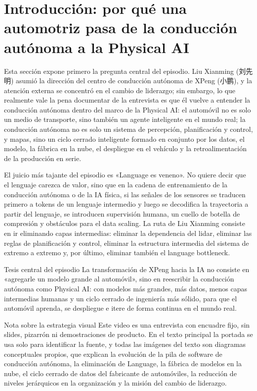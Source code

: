 \section{Introducción: por qué una automotriz pasa de la conducción autónoma a la Physical AI}

Esta sección expone primero la pregunta central del episodio. Liu Xianming (刘先明) asumió la dirección del centro de conducción autónoma de XPeng (小鹏), y la atención externa se concentró en el cambio de liderazgo; sin embargo, lo que realmente vale la pena documentar de la entrevista es que él vuelve a entender la conducción autónoma dentro del marco de la Physical AI: el automóvil no es solo un medio de transporte, sino también un agente inteligente en el mundo real; la conducción autónoma no es solo un sistema de percepción, planificación y control, y mapas, sino un ciclo cerrado inteligente formado en conjunto por los datos, el modelo, la fábrica en la nube, el despliegue en el vehículo y la retroalimentación de la producción en serie.

El juicio más tajante del episodio es «Language es veneno». No quiere decir que el lenguaje carezca de valor, sino que en la cadena de entrenamiento de la conducción autónoma o de la IA física, si las señales de los sensores se traducen primero a tokens de un lenguaje intermedio y luego se decodifica la trayectoria a partir del lenguaje, se introducen supervisión humana, un cuello de botella de compresión y obstáculos para el data scaling. La ruta de Liu Xianming consiste en ir eliminando capas intermedias: eliminar la dependencia del lidar, eliminar las reglas de planificación y control, eliminar la estructura intermedia del sistema de extremo a extremo y, por último, eliminar también el language bottleneck.

\begin{importantbox}{Tesis central del episodio}
La transformación de XPeng hacia la IA no consiste en «agregarle un modelo grande al automóvil», sino en reescribir la conducción autónoma como Physical AI: con modelos más grandes, más datos, menos capas intermedias humanas y un ciclo cerrado de ingeniería más sólido, para que el automóvil aprenda, se despliegue e itere de forma continua en el mundo real.
\end{importantbox}

\begin{knowledgebox}{Nota sobre la estrategia visual}
Este video es una entrevista con encuadre fijo, sin slides, pizarrón ni demostraciones de producto. En el texto principal la portada se usa solo para identificar la fuente, y todas las imágenes del texto son diagramas conceptuales propios, que explican la evolución de la pila de software de conducción autónoma, la eliminación de Language, la fábrica de modelos en la nube, el ciclo cerrado de datos del fabricante de automóviles, la reducción de niveles jerárquicos en la organización y la misión del cambio de liderazgo.
\end{knowledgebox}

